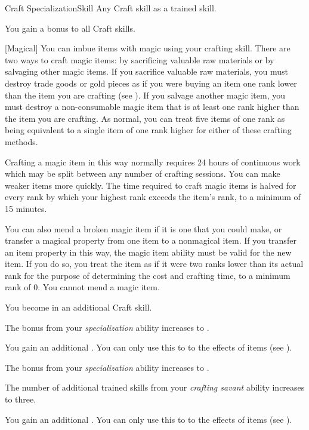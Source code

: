     \begin{feat}{Craft Specialization}{Skill}
        \featpre Any Craft skill as a trained skill.

         You gain a  bonus to all Craft skills.

        [Magical] You can imbue items with magic using your crafting skill.
        There are two ways to craft magic items: by sacrificing valuable raw materials or by salvaging other magic items.
        If you sacrifice valuable raw materials, you must destroy trade goods or gold pieces as if you were buying an item one rank lower than the item you are crafting  (see ).
        If you salvage another magic item, you must destroy a non-consumable magic item that is at least one rank higher than the item you are crafting.
        As normal, you can treat five items of one rank as being equivalent to a single item of one rank higher for either of these crafting methods.

        Crafting a magic item in this way normally requires 24 hours of continuous work which may be split between any number of crafting sessions.
        You can make weaker items more quickly.
        The time required to craft magic items is halved for every rank by which your highest rank exceeds the item's rank, to a minimum of 15 minutes.

        You can also mend a broken magic item if it is one that you could make, or transfer a magical property from one item to a nonmagical item.
        If you transfer an item property in this way, the magic item ability must be valid for the new item.
        If you do so, you treat the item as if it were two ranks lower than its actual rank for the purpose of determining the cost and crafting time, to a minimum rank of 0.
        You cannot mend a  magic item.

         You become  in an additional Craft skill.

         The bonus from your \textit{specialization} ability increases to .

         You gain an additional .
        You can only use this  to  to the effects of items (see ).

         The bonus from your \textit{specialization} ability increases to .

         The number of additional trained skills from your \textit{crafting savant} ability increases to three.

         You gain an additional .
        You can only use this  to  to the effects of items (see ).
    \end{feat}

